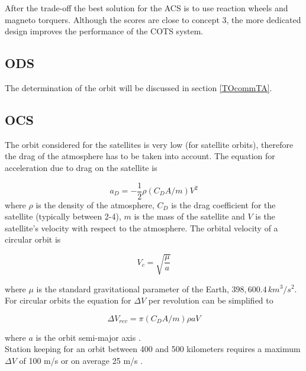 After the trade-off the best solution for the \ac{ACS} is to use reaction wheels and magneto torquers. Although the scores are close to concept 3, the more dedicated design improves the performance of the \ac{COTS} system.

\subsection{\ac{ODS}}
\label{ss:ods}
The determination of the orbit will be discussed in section \ref{TOcommTA}.

\subsection{\ac{OCS}}
\label{ss:ocs}
The orbit considered for the satellites is very low (for satellite orbits), therefore the drag of the atmosphere has to be taken into account. The equation for acceleration due to drag on the satellite is

\begin{equation}
a_D=-\frac{1}{2}\rho \left(C_DA/m\right)V^2
\label{eqn:atmosdrag}
\end{equation}
where $\rho$ is the density of the atmosphere, $C_D$ is the drag coefficient for the satellite (typically between 2-4), $m$ is the mass of the satellite and $V$ is the satellite's velocity with respect to the atmosphere. The orbital velocity of a circular orbit is

\begin{equation}
V_c=\sqrt{\frac{\mu}{a}}
\label{eqn:orbitalvel}
\end{equation}

where $\mu$ is the standard gravitational parameter of the Earth, $398,600.4 \,km^3/s^2$. For circular orbits the equation for $\Delta V$ per revolution can be simplified to

\begin{equation}
\Delta V_{rev}=\pi \left(C_DA/m\right)\rho a V
\label{eqn:deltaVrev}
\end{equation}

where $a$ is the orbit semi-major axis \cite{larson}.\\

Station keeping for an orbit between 400 and 500 kilometers requires a maximum $\Delta V$ of 100 m/s or on average 25 m/s \cite{deltavtu}.\\

